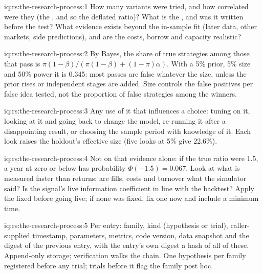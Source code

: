 \begin{solution}{iq:rs:the-research-process:1}
How many variants were tried, and how correlated were they (the , and so the deflated ratio)? What is the , and was it written before the test? What evidence exists beyond the in-sample fit (later data, other markets, side
predictions), and are the costs, borrow and capacity realistic?
\end{solution}

\begin{solution}{iq:rs:the-research-process:2}
By Bayes, the share of true strategies among those that pass is $\pi(1 - \beta)/(\pi(1 - \beta) + (1 - \pi)\alpha)$. With a 5\% prior,
5\% size and 50\% power it is 0.345: most passes are false whatever the size, unless the prior rises or independent stages
are added. Size controls the false positives per false idea tested, not the proportion of false strategies among the winners.
\end{solution}

\begin{solution}{iq:rs:the-research-process:3}
Any use of it that influences a choice: tuning on it, looking at it and going back to change the model, re-running it after a
disappointing result, or choosing the sample period with knowledge of it. Each look raises the holdout's effective size (five
looks at 5\% give 22.6\%).
\end{solution}

\begin{solution}{iq:rs:the-research-process:4}
Not on that evidence alone: if the true ratio were 1.5, a year at zero or below has probability $\Phi(-1.5) = 0.067$. Look at what
is measured faster than returns: are fills, costs and turnover what the simulator said? Is the signal's live information
coefficient in line with the backtest? Apply the  fixed before going live; if none was fixed, fix one now and
include a minimum time.
\end{solution}

\begin{solution}{iq:rs:the-research-process:5}
Per entry: family, kind (hypothesis or trial), caller-supplied timestamp, parameters, metrics, code version, data snapshot and
the digest of the previous entry, with the entry's own digest a hash of all of these. Append-only storage; verification walks
the chain. One hypothesis per family registered before any trial; trials before it flag the family post hoc.
\end{solution}

